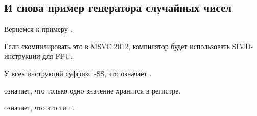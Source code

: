 \subsection{И снова пример генератора случайных чисел}
\label{FPU_PRNG_SIMD}

Вернемся к примеру  .

Если скомпилировать это в MSVC 2012, компилятор будет использовать SIMD-инструкции для FPU.



У всех инструкций суффикс -SS, это означает .

 означает, что только одно значение хранится в регистре.

 означает, что это тип \Tfloat.

